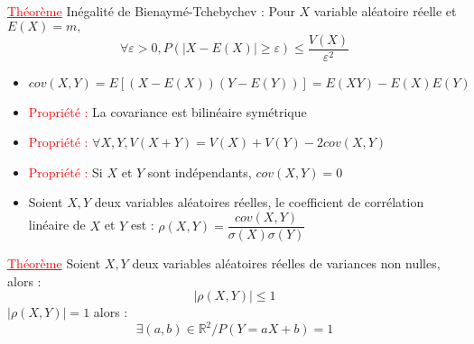 \documentclass[a4paper, 11pts, french]{article}
\newcommand{\R}{\mathbb{R}}
\newcommand{\si}{\sigma}
\newcommand{\ep}{\varepsilon}
\newcommand{\thm}{\textcolor{red}{\underline{Théorème} }}
\newcommand{\ppt}{\textcolor{red}{Propriété : }}
\begin{document}
	 \thm Inégalité de Bienaymé-Tchebychev : Pour $X$ variable aléatoire réelle et ${E(X)=m,}$
	 	\[\forall \ep>0, P(|X-E(X)|\geqslant\ep)\leqslant \frac{V(X)}{\ep^2}\]
	 
	  \begin{itemize}
		\item $cov(X,Y)=E[(X-E(X))(Y-E(Y))]=E(XY)-E(X)E(Y)$
		\item \ppt La covariance est bilinéaire symétrique
		\item \ppt $\forall X,Y, V(X+Y)=V(X)+V(Y)-2cov(X,Y)$
		\item \ppt Si $X$ et $Y$ sont indépendants, $cov(X,Y)=0$
		\item Soient $X,Y$ deux variables aléatoires réelles, le coefficient de corrélation linéaire de $X$ et $Y$ est : $\rho(X,Y)=\dfrac{cov(X,Y)}{\si(X)\si(Y)}$
	 \end{itemize}
	
	 \thm  Soient $X,Y$ deux variables aléatoires réelles de variances non nulles, alors :
	  \[{|\rho(X,Y)|\leqslant1}\]  \(|\rho(X,Y)|=1\) alors :
	  \[\exists  (a,b) \in \R^2 / P(Y=aX+b)=1\]
 
\end{document}

